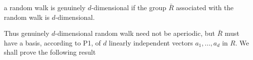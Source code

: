 a random walk is genuinely $d$-dimensional if the group $\bar{R}$ associated with the random walk is $d$-dimensional.

Thus genuinely $d$-dimensional random walk need not be aperiodic, but $\bar{R}$ must have a basis, according to P1, of $d$ linearly independent vectors $a_1, \ldots, a_d$ in $R$. We shall prove the following result